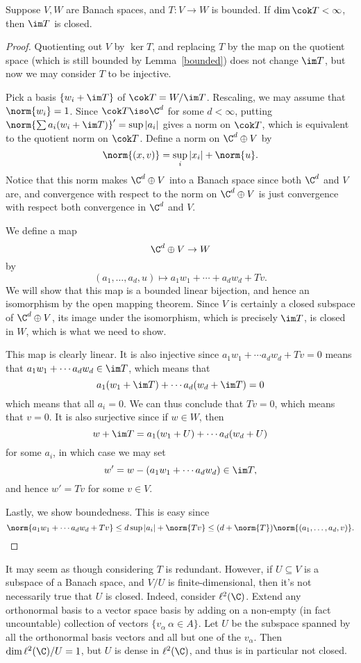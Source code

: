 \documentclass[12pt]{article}
\begin{document}
\begin{lem}\label{op}Suppose $V,W$ are Banach spaces, and $T:V \to W$ is bounded. If $\dim \cok T < \infty$, then $\im T$ is closed.\end{lem}
\begin{proof}
Quotienting out $V$ by $\ker T$, and replacing $T$ by the map on the quotient space (which is still bounded by Lemma~\ref{bounded}) does not change $\im T$, but now we may consider $T$ to be injective.

Pick a basis $\{w_i+\im T\}$ of $\cok T = W/\im T$. Rescaling, we may assume that $\norm{w_i} = 1$. Since $\cok T \iso \C^d$ for some $d < \infty$, putting $\norm{\sum a_i(w_i+\im T)}' = \sup |a_i|$ gives a norm on $\cok T$, which is equivalent to the quotient norm on $\cok T$.
Define a norm on $\C^d \oplus V$ by
\[\norm{(x,v)} = \sup_{i} |x_i| + \norm{u}.\]
Notice that this norm makes $\C^d \oplus V$ into a Banach space since both $\C^d$ and $V$ are, and convergence with respect to the norm on $\C^d \oplus V$ is just convergence with respect both convergence in $\C^d$ and $V$.

We define a map
\[\C^d\oplus V \to W\] by
\[(a_1,\ldots,a_d,u) \mapsto a_1w_1+\cdots + a_dw_d + Tv.\]
We will show that this map is a bounded linear bijection, and hence an isomorphism by the open mapping theorem. Since $V$ is certainly a closed subspace of $\C^d\oplus V$, its image under the isomorphism, which is precisely $\im T$, is closed in $W$, which is what we need to show.

This map is clearly linear. It is also injective since $a_1w_1+\cdots a_dw_d + Tv = 0$ means that $a_1w_1+\cdots a_dw_d \in \im T$, which means that 
\[a_1(w_1+\im T)+\cdots a_d(w_d+\im T) = 0\] which means that all $a_i = 0$. We can thus conclude that $Tv = 0$, which means that $v=0$. It is also surjective since if $w\in W$, then
\[w+\im T = a_1(w_1+U)+\cdots a_d(w_d+U)\] for some $a_i$, in which case we may set
\[w'= w-(a_1w_1+\cdots a_dw_d) \in \im T,\]
and hence $w' = Tv$ for some $v \in V$.

Lastly, we show boundedness. This is easy since
\[\norm{a_1w_1+\cdots a_dw_d + Tv} \leq d\sup |a_i| + \norm{Tv} \leq (d+\norm{T})\norm{(a_1,\ldots,a_d,v)}.\]\end{proof}
\begin{rk}It may seem as though considering $T$ is redundant. However, if $U \subseteq V$ is a subspace of a Banach space, and $V/U$ is finite-dimensional, then it's not necessarily true that $U$ is closed. Indeed, consider $\ell^2(\C)$. Extend any orthonormal basis to a vector space basis by adding on a non-empty (in fact uncountable) collection of vectors $\{v_{\alpha}\: \alpha \in A\}$. Let $U$ be the subspace spanned by all the orthonormal basis vectors and all but one of the $v_\alpha$. Then $\dim \ell^2(\C)/U = 1$, but $U$ is dense in $\ell^2(\C)$, and thus is in particular not closed.\end{rk} 
\end{document}
